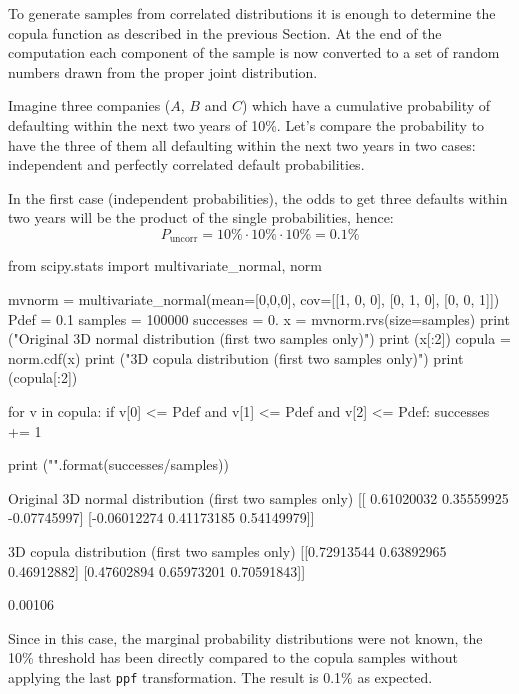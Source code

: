 To generate samples from correlated distributions it is enough to determine the copula function as described in the previous Section.
At the end of the computation each component of the sample is now converted to a set of random numbers drawn from the proper joint distribution.

Imagine three companies ($A$, $B$ and $C$) which have a cumulative probability of defaulting within the next two years of 10\%.
Let's compare the probability to have the three of them all defaulting within the next two years in two cases: independent and perfectly correlated default probabilities.

In the first case (independent probabilities), the odds to get three defaults within two years will be the product of the single probabilities, hence:
\begin{equation}
P_{\mathrm{uncorr}} = 10\% \cdot 10\% \cdot 10\% = 0.1 \%
\end{equation}

\begin{ipython}
from scipy.stats import multivariate_normal, norm

mvnorm = multivariate_normal(mean=[0,0,0], cov=[[1, 0, 0],
                                                [0, 1, 0],
                                                [0, 0, 1]])
Pdef = 0.1
samples = 100000
successes = 0.
x = mvnorm.rvs(size=samples)
print ("Original 3D normal distribution (first two samples only)")
print (x[:2])
copula = norm.cdf(x)
print ("\n3D copula distribution (first two samples only)")
print (copula[:2])

for v in copula:
  if v[0] <= Pdef and v[1] <= Pdef and v[2] <= Pdef:
    successes += 1
        
print ("\n{}".format(successes/samples))
\end{ipython}
\begin{ioutput}
Original 3D normal distribution (first two samples only)
[[ 0.61020032  0.35559925 -0.07745997]
 [-0.06012274  0.41173185  0.54149979]]

3D copula distribution (first two samples only)
[[0.72913544 0.63892965 0.46912882]
 [0.47602894 0.65973201 0.70591843]]

0.00106
\end{ioutput}
\noindent
Since in this case, the marginal probability distributions were not known, the 10\% threshold has been directly compared to the copula samples without applying the last \texttt{ppf} transformation.
The result is 0.1\% as expected.

